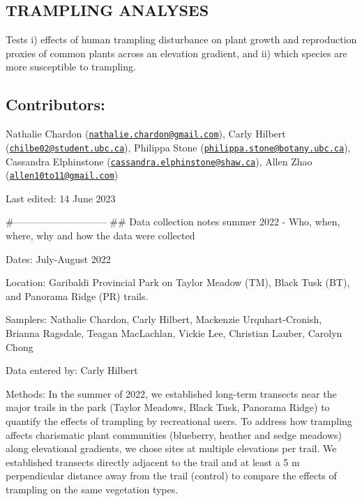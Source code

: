 \documentclass[
]{article}
\author{}
\date{\vspace{-2.5em}}
\begin{document}
\hypertarget{trampling-analyses}{%
\subsection{TRAMPLING ANALYSES}\label{trampling-analyses}}

Tests i) effects of human trampling disturbance on plant growth and
reproduction proxies of common plants across an elevation gradient, and
ii) which species are more susceptible to trampling.

\hypertarget{contributors}{%
\subsection{Contributors:}\label{contributors}}

Nathalie Chardon
(\href{mailto:nathalie.chardon@gmail.com}{\nolinkurl{nathalie.chardon@gmail.com}}),
Carly Hilbert
(\href{mailto:chilbe02@student.ubc.ca}{\nolinkurl{chilbe02@student.ubc.ca}}),
Philippa Stone
(\href{mailto:philippa.stone@botany.ubc.ca}{\nolinkurl{philippa.stone@botany.ubc.ca}}),
Cassandra Elphinstone
(\href{mailto:cassandra.elphinstone@shaw.ca}{\nolinkurl{cassandra.elphinstone@shaw.ca}}),
Allen Zhao
(\href{mailto:allen10to11@gmail.com}{\nolinkurl{allen10to11@gmail.com}})

Last edited: 14 June 2023

\#----------------------------- \#\# Data collection notes summer 2022 -
Who, when, where, why and how the data were collected

Dates: July-August 2022

Location: Garibaldi Provincial Park on Taylor Meadow (TM), Black Tusk
(BT), and Panorama Ridge (PR) trails.

Samplers: Nathalie Chardon, Carly Hilbert, Mackenzie Urquhart-Cronish,
Brianna Ragsdale, Teagan MacLachlan, Vickie Lee, Christian Lauber,
Carolyn Chong

Data entered by: Carly Hilbert

Methods: In the summer of 2022, we established long-term transects near
the major trails in the park (Taylor Meadows, Black Tusk, Panorama
Ridge) to quantify the effects of trampling by recreational users. To
address how trampling affects charismatic plant communities (blueberry,
heather and sedge meadows) along elevational gradients, we chose sites
at multiple elevations per trail. We established transects directly
adjacent to the trail and at least a 5 m perpendicular distance away
from the trail (control) to compare the effects of trampling on the same
vegetation types.
\end{document}
